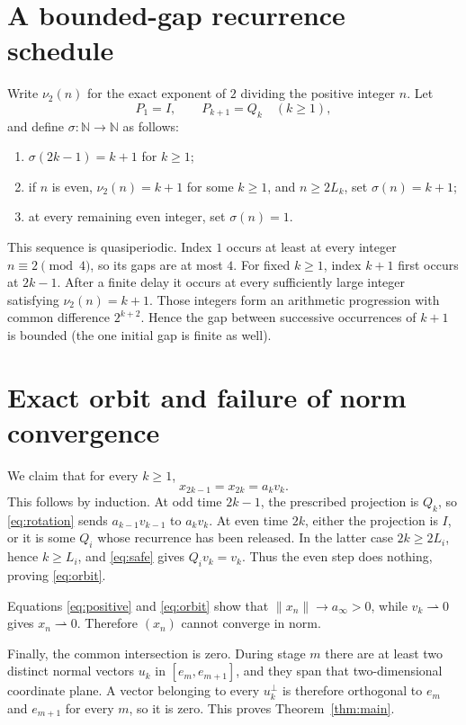 \documentclass[11pt]{article}
\newcommand{\N}{\mathbb N}
\begin{document}
\section{A bounded-gap recurrence schedule}

Write $\nu_2(n)$ for the exact exponent of $2$ dividing the positive
integer $n$.  Let
\[
 P_1=I,\qquad P_{k+1}=Q_k\quad(k\geq1),
\]
and define $\sigma:\N\to\N$ as follows:
\begin{enumerate}
\item $\sigma(2k-1)=k+1$ for $k\geq1$;
\item if $n$ is even, $\nu_2(n)=k+1$ for some $k\geq1$, and
      $n\geq2L_k$, set $\sigma(n)=k+1$;
\item at every remaining even integer, set $\sigma(n)=1$.
\end{enumerate}

This sequence is quasiperiodic.  Index $1$ occurs at least at every integer
$n\equiv2\pmod4$, so its gaps are at most $4$.  For fixed $k\geq1$, index
$k+1$ first occurs at $2k-1$.  After a finite delay it occurs at every
sufficiently large integer satisfying $\nu_2(n)=k+1$.  Those integers form
an arithmetic progression with common difference $2^{k+2}$.  Hence the gap
between successive occurrences of $k+1$ is bounded (the one initial gap is
finite as well).

\section{Exact orbit and failure of norm convergence}

We claim that for every $k\geq1$,
\begin{equation}\label{eq:orbit}
 x_{2k-1}=x_{2k}=a_kv_k.
\end{equation}
This follows by induction.  At odd time $2k-1$, the prescribed projection is
$Q_k$, so \eqref{eq:rotation} sends $a_{k-1}v_{k-1}$ to $a_kv_k$.
At even time $2k$, either the projection is $I$, or it is some $Q_i$ whose
recurrence has been released.  In the latter case $2k\geq2L_i$, hence
$k\geq L_i$, and \eqref{eq:safe} gives $Q_iv_k=v_k$.  Thus the even step
does nothing, proving \eqref{eq:orbit}.

Equations \eqref{eq:positive} and \eqref{eq:orbit} show that
$\|x_n\|\to a_\infty>0$, while $v_k\rightharpoonup0$ gives
$x_n\rightharpoonup0$.  Therefore $(x_n)$ cannot converge in norm.

Finally, the common intersection is zero.  During stage $m$ there are at
least two distinct normal vectors $u_k$ in $[e_m,e_{m+1}]$, and they span
that two-dimensional coordinate plane.  A vector belonging to every
$u_k^\perp$ is therefore orthogonal to $e_m$ and $e_{m+1}$ for every $m$,
so it is zero.  This proves Theorem~\ref{thm:main}.
\end{document}

